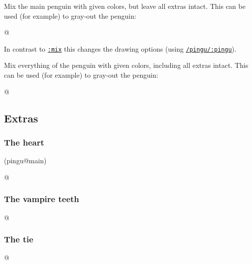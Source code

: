 \documentclass[parskip=half,english,numbers=noenddot,footnotes=nomultiple,oneside,fontsize=10pt,DIV=15,headinclude]{scrartcl}
\makeatletter
\def\pingu@listing@text{}
\def\lpingu#1{\begingroup\def\pingu@listing@text{#1}\lstinline[style=lstpingu,breakatwhitespace]'#1'\endgroup}
\def\cursub{}
\newcommand*\keyref[2][/pingu/]{\hyperref[pk:#1#2]{\lpingu{#1#2}}}
\newcommand*\dkeyref[2][/pingu/]{\hyperref[pk:#1#2]{\lpingu{#2}}}
\makeatother
\begin{document}
	Mix the main penguin with given colors, but leave all extras intact. This can be used (for example) to gray-out the penguin:
\begin{tcblisting}{@}
\begin{tikzpicture}
	\pingu[mask,tie=red,:mix-draw=50!green]
\end{tikzpicture}
\end{tcblisting}
	In contrast to \dkeyref{:mix} this changes the drawing options (using \keyref{:pingu}).
\endkeyexplain

	Mix everything of the penguin with given colors, including all extras intact. This can be used (for example) to gray-out the penguin:
\begin{tcblisting}{@}
\begin{tikzpicture}
	\pingu[mask,tie=red,lollipop left,:mix-all=50!green]
\end{tikzpicture}
\end{tcblisting}
\endkeyexplain

\def\cursub{}
\subsection{Extras}
\subsubsection{The heart}
(pingu@main)
\begin{tcblisting}{@}
\begin{tikzpicture}
	\pingu[heart=green]
\end{tikzpicture}
\end{tcblisting}
\endshowkeyexplain

\subsubsection{The vampire teeth}
\begin{tcblisting}{@}
\begin{tikzpicture}
	\pingu[vampire teeth=green]
\end{tikzpicture}
\end{tcblisting}
\endshowkeyexplain

\subsubsection{The tie}
\begin{tcblisting}{@}
\begin{tikzpicture}
	\pingu[tie]
\end{tikzpicture}
\end{tcblisting}
\endshowkeyexplain
\end{document}
